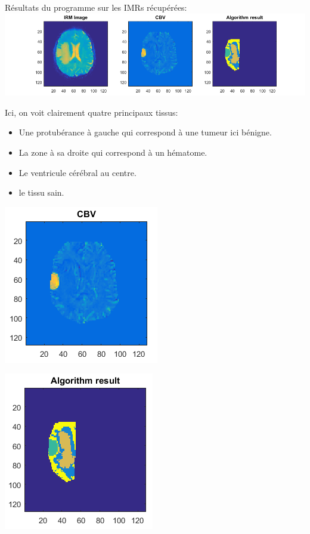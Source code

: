 \documentclass{beamer}
\begin{document}
\begin{frame}

Résultats du programme sur les IMRs récupérées:
\includegraphics[scale=0.40]{Patient4Result.png}

Ici, on voit clairement quatre principaux tissus:
\begin{itemize}
\item Une protubérance à gauche qui correspond à une tumeur ici bénigne.
\item La zone à sa droite qui correspond à un hématome.
\item Le ventricule cérébral au centre.
\item le tissu sain.
\end{itemize}
\end{frame}

\begin{frame}
\centering

\includegraphics[scale=0.8]{Patient4Result-CBV.png}

\end{frame}

\begin{frame}
\centering

\includegraphics[scale=0.8]{Patient4Result-ALGO.png}

\end{frame}
\end{document}
